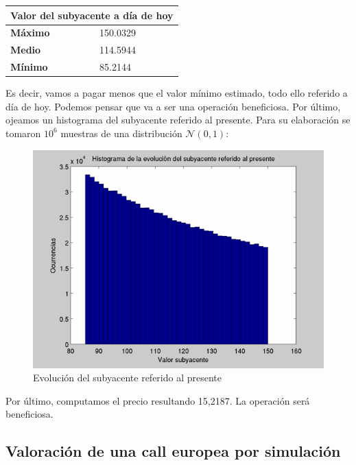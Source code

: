 \documentclass[a4paper,11pt]{article}
\begin{document}
\begin{center}
\begin{tabular}{|p{2.5cm}|p{3.5cm}|}
\hline
\multicolumn{2}{|c|}{\textbf{Valor del subyacente a d\'ia de hoy}}\\
\hline
\hline
\textbf{M\'aximo} & 150.0329\\
\hline
\textbf{Medio}    & 114.5944\\
\hline
\textbf{M\'inimo} & 85.2144\\
\hline
\end{tabular}
\end{center}

Es decir, vamos a pagar menos que el valor m\'inimo estimado, todo ello referido
a d\'ia de hoy. Podemos pensar que va a ser una operaci\'on
beneficiosa. Por \'ultimo, ojeamos un histograma del subyacente referido al presente. Para su
elaboraci\'on se tomaron $10^6$ muestras de una distribuci\'on $\mathcal{N}(0,1)$:

\begin{figure}[htb]
   \begin{center}
      \includegraphics[scale=0.5,
      keepaspectratio]{./figures/histCallEUquad.png}
   \end{center}
   \caption{Evoluci\'on del subyacente referido al presente}
\end{figure}

Por \'ultimo, computamos el precio resultando 15,2187. La operaci\'on ser\'a
beneficiosa.

\subsection{Valoraci\'on de una call europea por simulaci\'on}
\end{document}
